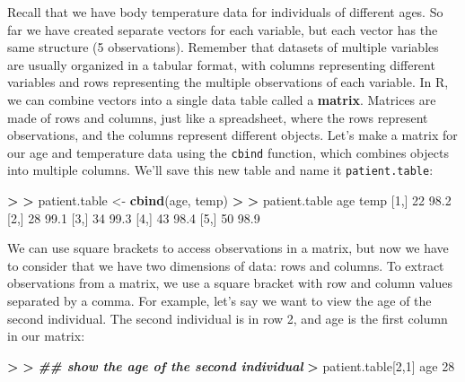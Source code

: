 \documentclass[
]{book}
\newenvironment{Shaded}{\begin{snugshade}}{\end{snugshade}}
\newcommand{\DecValTok}[1]{\textcolor[rgb]{0.00,0.00,0.81}{#1}}
\newcommand{\DocumentationTok}[1]{\textcolor[rgb]{0.56,0.35,0.01}{\textbf{\textit{#1}}}}
\newcommand{\ErrorTok}[1]{\textcolor[rgb]{0.64,0.00,0.00}{\textbf{#1}}}
\newcommand{\FloatTok}[1]{\textcolor[rgb]{0.00,0.00,0.81}{#1}}
\newcommand{\FunctionTok}[1]{\textcolor[rgb]{0.13,0.29,0.53}{\textbf{#1}}}
\newcommand{\NormalTok}[1]{#1}
\newcommand{\OtherTok}[1]{\textcolor[rgb]{0.56,0.35,0.01}{#1}}
\newcommand{\SpecialCharTok}[1]{\textcolor[rgb]{0.81,0.36,0.00}{\textbf{#1}}}
\begin{document}
Recall that we have body temperature data for individuals of different ages. So far we have created separate vectors for each variable, but each vector has the same structure (5 observations). Remember that datasets of multiple variables are usually organized in a tabular format, with columns representing different variables and rows representing the multiple observations of each variable. In R, we can combine vectors into a single data table called a \textbf{matrix}. Matrices are made of rows and columns, just like a spreadsheet, where the rows represent observations, and the columns represent different objects. Let's make a matrix for our age and temperature data using the \texttt{cbind} function, which combines objects into multiple columns. We'll save this new table and name it \texttt{patient.table}:

\begin{Shaded}
\begin{Highlighting}[]
\SpecialCharTok{\textgreater{}} 
\ErrorTok{\textgreater{}}\NormalTok{ patient.table }\OtherTok{\textless{}{-}} \FunctionTok{cbind}\NormalTok{(age, temp)}
\SpecialCharTok{\textgreater{}} 
\ErrorTok{\textgreater{}}\NormalTok{ patient.table}
\NormalTok{     age temp}
\NormalTok{[}\DecValTok{1}\NormalTok{,]  }\DecValTok{22} \FloatTok{98.2}
\NormalTok{[}\DecValTok{2}\NormalTok{,]  }\DecValTok{28} \FloatTok{99.1}
\NormalTok{[}\DecValTok{3}\NormalTok{,]  }\DecValTok{34} \FloatTok{99.3}
\NormalTok{[}\DecValTok{4}\NormalTok{,]  }\DecValTok{43} \FloatTok{98.4}
\NormalTok{[}\DecValTok{5}\NormalTok{,]  }\DecValTok{50} \FloatTok{98.9}
\end{Highlighting}
\end{Shaded}

We can use square brackets to access observations in a matrix, but now we have to consider that we have two dimensions of data: rows and columns. To extract observations from a matrix, we use a square bracket with row and column values separated by a comma. For example, let's say we want to view the age of the second individual. The second individual is in row 2, and age is the first column in our matrix:

\begin{Shaded}
\begin{Highlighting}[]
\SpecialCharTok{\textgreater{}} 
\ErrorTok{\textgreater{}} \DocumentationTok{\#\# show the age of the second individual}
\ErrorTok{\textgreater{}}\NormalTok{ patient.table[}\DecValTok{2}\NormalTok{,}\DecValTok{1}\NormalTok{]}
\NormalTok{age }
 \DecValTok{28} 
\end{Highlighting}
\end{Shaded}
\end{document}
